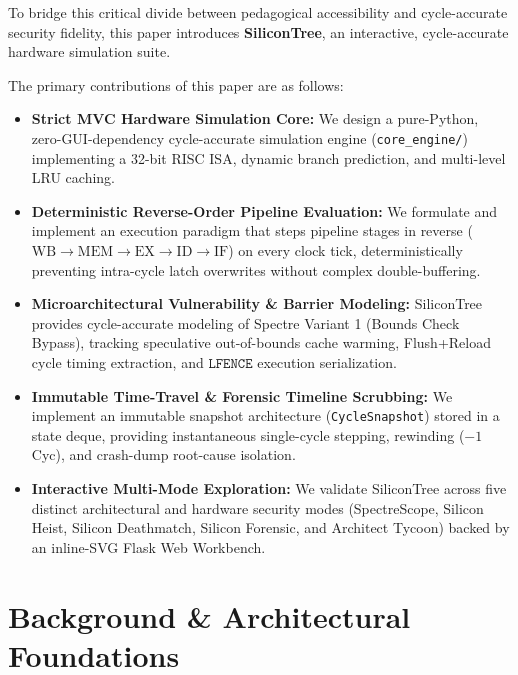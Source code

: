 \documentclass[journal,twocolumn,10pt]{IEEEtran}
\begin{document}
To bridge this critical divide between pedagogical accessibility and cycle-accurate security fidelity, this paper introduces \textbf{SiliconTree}, an interactive, cycle-accurate hardware simulation suite. 

The primary contributions of this paper are as follows:
\begin{itemize}
    \item \textbf{Strict MVC Hardware Simulation Core:} We design a pure-Python, zero-GUI-dependency cycle-accurate simulation engine (\texttt{core\_engine/}) implementing a 32-bit RISC ISA, dynamic branch prediction, and multi-level LRU caching.
    \item \textbf{Deterministic Reverse-Order Pipeline Evaluation:} We formulate and implement an execution paradigm that steps pipeline stages in reverse ($\text{WB} \to \text{MEM} \to \text{EX} \to \text{ID} \to \text{IF}$) on every clock tick, deterministically preventing intra-cycle latch overwrites without complex double-buffering.
    \item \textbf{Microarchitectural Vulnerability \& Barrier Modeling:} SiliconTree provides cycle-accurate modeling of Spectre Variant 1 (Bounds Check Bypass), tracking speculative out-of-bounds cache warming, Flush+Reload cycle timing extraction, and $\texttt{LFENCE}$ execution serialization.
    \item \textbf{Immutable Time-Travel \& Forensic Timeline Scrubbing:} We implement an immutable snapshot architecture (\texttt{CycleSnapshot}) stored in a state deque, providing instantaneous single-cycle stepping, rewinding ($-1$ Cyc), and crash-dump root-cause isolation.
    \item \textbf{Interactive Multi-Mode Exploration:} We validate SiliconTree across five distinct architectural and hardware security modes (SpectreScope, Silicon Heist, Silicon Deathmatch, Silicon Forensic, and Architect Tycoon) backed by an inline-SVG Flask Web Workbench.
\end{itemize}

\section{Background \& Architectural Foundations}
\end{document}

